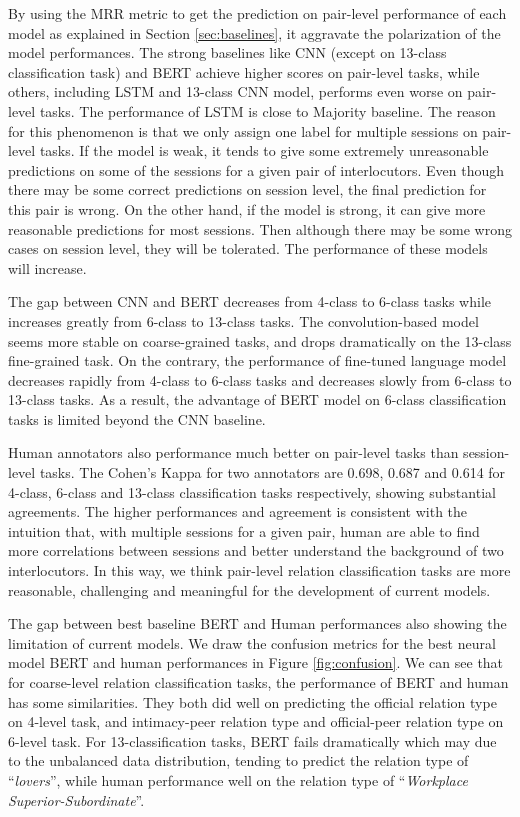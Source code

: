 By using the MRR metric to get the prediction on pair-level performance of each model as explained in Section \ref{sec:baselines}, it aggravate the polarization of the model performances. The strong baselines like CNN (except on 13-class classification task) and BERT achieve higher scores on pair-level tasks, while others, including LSTM and 13-class CNN model, performs even worse on pair-level tasks. The performance of LSTM is close to Majority baseline. The reason for this phenomenon is that we only assign one label for multiple sessions on pair-level tasks. If the model is weak, it tends to give some extremely unreasonable predictions on some of the sessions for a given pair of interlocutors. Even though there may be some correct predictions on session level, the final prediction for this pair is wrong. On the other hand, if the model is strong, it can give more reasonable predictions for most sessions. Then although there may be some wrong cases on session level, they will be tolerated. The performance of these models will increase.

The gap between CNN and BERT decreases from 4-class to 6-class tasks while increases greatly from 6-class to 13-class tasks. The convolution-based model seems more stable on coarse-grained tasks, and drops dramatically on the 13-class fine-grained task. On the contrary, the performance of fine-tuned language model decreases rapidly from 4-class to 6-class tasks and decreases slowly from 6-class to 13-class tasks. As a result, the advantage of BERT model on 6-class classification tasks is limited beyond the CNN baseline.

Human annotators also performance much better on pair-level tasks than session-level tasks. The Cohen's Kappa for two annotators are 0.698, 0.687 and 0.614 for 4-class, 6-class and 13-class classification tasks respectively, showing substantial agreements. The higher performances and agreement is consistent with the intuition that, with multiple sessions for a given pair, human are able to find more correlations between sessions and better understand the background of two interlocutors. In this way, we think pair-level relation classification tasks are more reasonable, challenging and meaningful for the development of current models. 

The gap between best baseline BERT and Human performances also showing the limitation of current models. We draw the confusion metrics for the best neural model BERT and human performances in Figure \ref{fig:confusion}. We can see that for coarse-level relation classification tasks, the performance of BERT and human has some similarities. They both did well on predicting the official relation type on 4-level task, and intimacy-peer relation type and official-peer relation type on 6-level task. For 13-classification tasks, BERT fails dramatically which may due to the unbalanced data distribution, tending to predict the relation type of ``{\em lovers}'', while human performance well on the relation type of ``{\em Workplace Superior-Subordinate}''.

